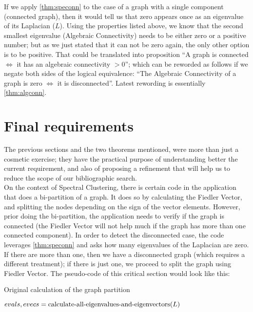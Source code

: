 If we apply \cref{thm:speconn} to the case of a graph with a single
component (connected graph), then it would tell us that zero appears
once as an eigenvalue of its Laplacian ($L$). Using the properties listed above, we
know that the second smallest eigenvalue (Algebraic Connectivity)
needs to be either zero or a 
positive number; but as we just stated that it can not be zero again, the
only other option is to be positive. That could be translated into
proposition  ``A graph is connected $\iff$ it has an algebraic
connectivity $> 0$''; which can be reworded as follows if we negate both sides of
the logical equivalence: ``The
Algebraic Connectivity of a graph is zero $\iff$ it is
disconnected''. Latest rewording is essentially \cref{thm:algconn}.

\section{Final requirements}

The previous sections and the two theorems mentioned, were more than
just a cosmetic exercise; they have the practical purpose of
understanding better the current requirement, and also of proposing a
refinement that will help us to reduce the scope of our bibliographic
search. \\

On the context of Spectral Clustering, there is certain code in the
application that does a bi-partition of a graph. It does so by
calculating the Fiedler Vector, and splitting the nodes depending on
the sign of the vector elements. However, prior doing the
bi-partition, the application needs to verify if the graph is
connected (the Fiedler Vector will not help much if the graph has more
than one connected component). In order to detect the disconnected
case, the code leverages \cref{thm:speconn} and asks how many
eigenvalues of the Laplacian are 
zero. If there are more than one, then we have a disconnected graph
(which requires a different treatment); if there is just one, we
proceed to split the graph using Fiedler Vector. The pseudo-code of
this critical section would look like this: \\

\begin{algorithm}
  \label{alg:orig-code}
  \caption{Original calculation of the graph partition}
%
  \DontPrintSemicolon
%
%
%
    $evals, evecs = \operatorname{calculate-all-eigenvalues-and-eigenvectors}(L)$ \;
%    
    {
       \;
    }
    \Else
    {
       \;
    }
\end{algorithm}
\hfill

